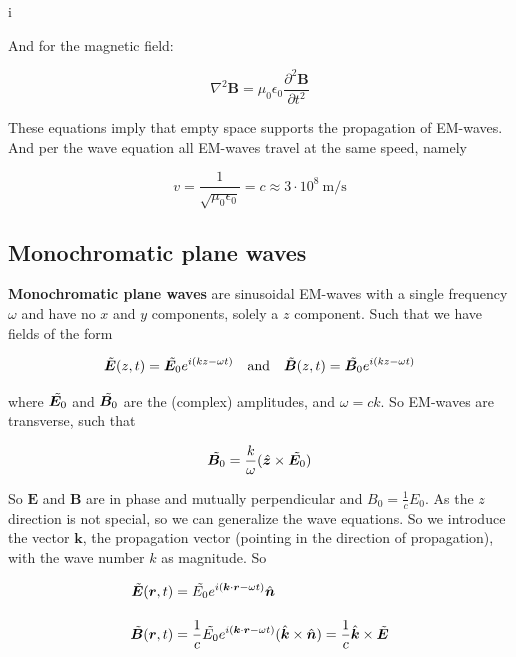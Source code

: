 i\documentclass[a4paper]{article}
\begin{document}
And for the magnetic field:

\begin{equation}
    \nabla^2\bm{B}=\mu_0\epsilon_0\frac{\partial^2\bm{B}}{\partial t^2}
\end{equation}

These equations imply that empty space supports the propagation of EM-waves. And per the wave equation all EM-waves travel at the same speed, namely

\begin{equation}
    v=\frac{1}{\sqrt{\mu_0\epsilon_0}}=c\approx 3\cdot 10^8\ \si{\meter\per\second}
\end{equation}

\subsection{Monochromatic plane waves}

\textbf{Monochromatic plane waves} are sinusoidal EM-waves with a single frequency $\omega$ and have no $x$ and $y$ components, solely a $z$ component. Such that we have fields of the form

\begin{equation*}
    \Tilde{\bm{E}}(z, t) = \Tilde{\bm{E}_0}e^{i(kz-\omega t)}\quad\text{and}\quad\Tilde{\bm{B}}(z, t) = \Tilde{\bm{B}_0}e^{i(kz-\omega t)}
\end{equation*}

where $\Tilde{\bm{E}_0}$ and $\Tilde{\bm{B}_0}$ are the (complex) amplitudes, and $\omega=ck$. So EM-waves are transverse, such that

\begin{equation*}
    \Tilde{\bm{B}_0}=\frac{k}{\omega}(\hat{\bm{z}}\times\Tilde{\bm{E}_0})
\end{equation*}

So $\bm{E}$ and $\bm{B}$ are in phase and mutually perpendicular and $B_0=\frac{1}{c}E_0$. As the $z$ direction is not special, so we can generalize the wave equations. So we introduce the vector $\bm{k}$, the propagation vector (pointing in the direction of propagation), with the wave number $k$ as magnitude. So

\begin{align*}
    \Tilde{\bm{E}}(\bm{r}, t) &= \Tilde{E_0}e^{i(\bm{k}\cdot\bm{r}-\omega t)}\hat{\bm{n}}\\[1em]
    \Tilde{\bm{B}}(\bm{r}, t) &= \frac{1}{c}\Tilde{E_0}e^{i(\bm{k}\cdot\bm{r}-\omega t)}(\hat{\bm{k}}\times\hat{\bm{n}})=\frac{1}{c}\hat{\bm{k}}\times\Tilde{\bm{E}}
\end{align*}
\end{document}
